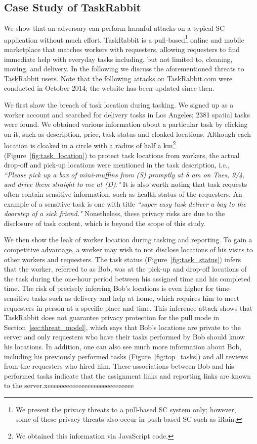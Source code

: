 \documentclass{USC-Thesis}
\numberwithin{equation}{chapter}
\begin{document}
\subsection{Case Study of TaskRabbit}
\label{sec:tasktabbit}
We show that an adversary can perform harmful attacks on a typical SC application without much effort. TaskRabbit is a pull-based\footnote{We present the privacy threats to a pull-based SC system only; however, some of these privacy threats also occur in push-based SC such as iRain.} online and mobile marketplace that matches workers with requesters, allowing requesters to find immediate help with everyday tasks including, but not limited to, cleaning, moving, and delivery. In the following we discuss the aforementioned threats to TaskRabbit  users. Note that the following attacks on TaskRabbit.com were conducted in October 2014; the website has been updated since then.

We first show the breach of task location during tasking. 
We signed up as a worker account and searched for delivery tasks in Los Angeles; 2381 spatial tasks were found. We obtained various information about a particular task by clicking on it, such as description, price, task status and cloaked locations. Although each location is cloaked in a circle with a radius of half a km\footnote{We obtained this information via JavaScript code.} (Figure~\ref{fig:task_location}) to protect task locations from workers, the actual drop-off and pick-up locations were mentioned in the task description, i.e., \emph{``Please pick up a box of mini-muffins from (S) promptly at 8 am on Tues, 9/4, and drive them straight to me at (D)."}
It is also worth noting that task requests often contain sensitive information, such as health status of the requesters. An example of a sensitive task is one with title \emph{``super easy task deliver a bag to the doorstep of a sick friend."}
Nonetheless, these privacy risks are due to the disclosure of task content, which is beyond the scope of this study.

We then show the leak of worker location during tasking and reporting. To gain a competitive advantage, a worker may wish to not disclose locations of his visits to other workers and requesters.
The task status (Figure~\ref{fig:task_status}) infers that the worker, referred to as Bob, was at the pick-up and drop-off locations of the task during the one-hour period between his assigned time and his completed time. The risk of precisely inferring Bob's locations is even higher for time-sensitive tasks such as delivery and help at home, which requires him to meet requesters in-person at a specific place and time. This inference attack shows that TaskRabbit does not guarantee privacy protection for the pull mode in Section~\ref{sec:threat_model}, which says that Bob's locations are private to the server and only requesters who have their tasks performed by Bob should know his locations.
In addition, one can also see much more information about Bob, including his previously performed tasks (Figure~\ref{fig:top_tasks}) and all reviews from the requesters who hired him. These associations between Bob and his performed tasks indicate that the assignment links and reporting links are known to the server.xeeeeeeeeeeeeeeeeeeeeeeeeeeee
\end{document}
